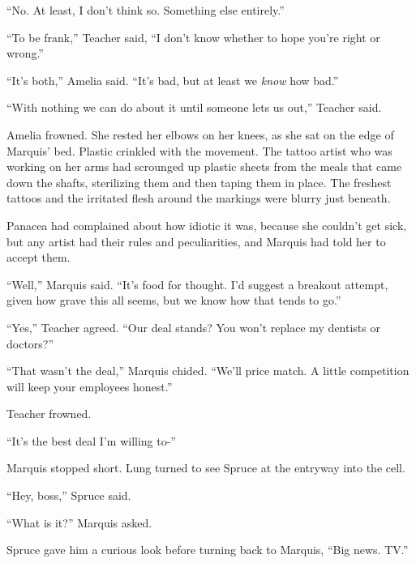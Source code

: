 ``No.  At least, I don't think so.  Something else entirely.''



``To be frank,'' Teacher said, ``I don't know whether to hope you're right or wrong.''



``It's both,'' Amelia said.  ``It's bad, but at least we \emph{know} how bad.''



``With nothing we can do about it until someone lets us out,'' Teacher said.



Amelia frowned.  She rested her elbows on her knees, as she sat on the edge of Marquis' bed.  Plastic crinkled with the movement.  The tattoo artist who was working on her arms had scrounged up plastic sheets from the meals that came down the shafts, sterilizing them and then taping them in place.  The freshest tattoos and the irritated flesh around the markings were blurry just beneath.



Panacea had complained about how idiotic it was, because she couldn't get sick, but any artist had their rules and peculiarities, and Marquis had told her to accept them.



``Well,'' Marquis said.  ``It's food for thought.  I'd suggest a breakout attempt, given how grave this all seems, but we know how that tends to go.''



``Yes,'' Teacher agreed.  ``Our deal stands?  You won't replace my dentists or doctors?''



``That wasn't the deal,'' Marquis chided.  ``We'll price match.  A little competition will keep your employees honest.''



Teacher frowned.



``It's the best deal I'm willing to-''



Marquis stopped short.  Lung turned to see Spruce at the entryway into the cell.



``Hey, boss,'' Spruce said.



``What is it?'' Marquis asked.



Spruce gave him a curious look before turning back to Marquis, ``Big news. TV.''



